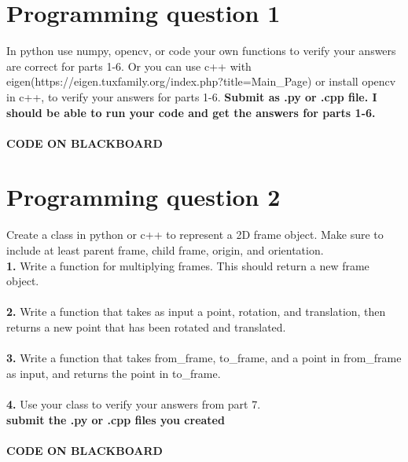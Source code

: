 \documentclass{article}
\begin{document}
\section{Programming question 1}
In python use numpy, opencv, or code your own functions to verify your answers are correct for parts 1-6.
Or you can use c++ with \\eigen(https://eigen.tuxfamily.org/index.php?title=Main\_Page) or install opencv in c++, to verify your answers for parts 1-6. \textbf{Submit as .py or .cpp file. I should be able to run your code and get the answers for parts 1-6.}\\\\
\textbf{CODE ON BLACKBOARD}

\section{Programming question 2}
Create a class in python or c++ to represent a 2D frame object. Make sure to include at least parent frame, child frame, origin, and orientation.\\
\textbf{1. } Write a function for multiplying frames. This should return a new frame object.\\\\
\textbf{2. } Write a function that takes as input a point, rotation, and translation, then returns a new point that has been rotated and translated.\\\\
\textbf{3. } Write a function that takes from\_frame, to\_frame, and a point in from\_frame as input, and returns the point in to\_frame.\\\\
\textbf{4. }  Use your class to verify your answers from part 7.\\
\textbf{submit the .py or .cpp files you created}\\\\
\textbf{CODE ON BLACKBOARD}
\end{document}
